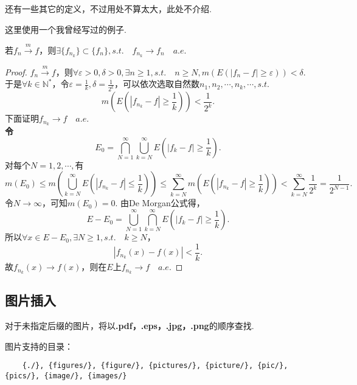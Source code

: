 \documentclass[bwprint, withouttitlepage]{mathexpthesis}
\begin{document}
还有一些其它的定义，不过用处不算太大，此处不介绍.

这里使用一个我曾经写过的例子.

\begin{theorem}[Risez定理]
    若$f_n \stackrel{m}{\longrightarrow} f$，则$\exists \{f_{n_k}\} \subset \{f_n\}, s.t. \quad f_{n_k} \to f_n \quad a.e.$
\end{theorem}

\begin{proof}
    $f_n \stackrel{m}{\longrightarrow} f$，则$\forall \varepsilon > 0, \delta > 0, \exists n \geqslant 1, s.t. \quad n \geqslant N, m(E(|f_n - f| \geqslant \varepsilon)) < \delta$.
    于是$\forall k \in \mathbb{N}^*$，令$\varepsilon = \frac{1}{k}, \delta = \frac{1}{2^k}$，可以依次选取自然数$n_1, n_2, \cdots, n_k, \cdots, s.t.$
    \begin{equation*}
        m(E(|f_{n_k} - f| \geqslant \frac{1}{k})) < \frac{1}{2^k}.
    \end{equation*}
    下面证明$f_{n_k} \to f \quad a.e.$ \\
    \textbf{令\[E_0 = \bigcap_{N = 1}^{\infty}{\bigcup_{k = N}^{\infty}{E(|f_k - f| \geqslant \frac{1}{k})}}.\]}
    对每个$N = 1, 2, \cdots, $有
    \begin{equation*}
        m(E_0) \leqslant m(\bigcup_{k = N}^{\infty}{E(|f_{n_k} - f| \leqslant \frac{1}{k})}) \leqslant \sum_{k = N}^{\infty}{m(E(|f_{n_k} - f| \geqslant \frac{1}{k}))} < \sum_{k = N}^{\infty}{\frac{1}{2^k}} = \frac{1}{2^{N - 1}}.
    \end{equation*}
    令$N \to \infty$，可知$m(E_0) = 0$.
    由De Morgan公式得，
    \begin{equation*}
        E - E_0 = \bigcup_{N = 1}^{\infty}{\bigcap_{k = N}^{\infty}{E(|f_k - f| \geqslant \frac{1}{k})}}.
    \end{equation*}
    所以$\forall x \in E - E_0, \exists N \geqslant 1, s.t. \quad k \geqslant N$，
    \begin{equation*}
        |f_{n_k}(x) - f(x)| < \frac{1}{k}.
    \end{equation*}
    故$f_{n_k}(x) \to f(x)$，则在$E$上$f_{n_k} \to f \quad a.e.$
\end{proof}

\subsection{图片插入}
对于未指定后缀的图片，将以\textbf{.pdf，.eps，.jpg，.png}的顺序查找.

图片支持的目录：
\begin{verbatim}
    {./}, {figures/}, {figure/}, {pictures/}, {picture/}, {pic/}, {pics/}, {image/}, {images/}
\end{verbatim}
\end{document}
